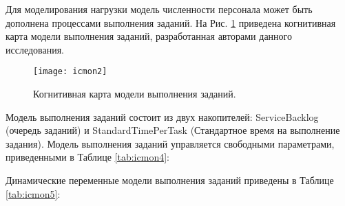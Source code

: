 Для моделирования нагрузки модель численности персонала может быть дополнена процессами выполнения заданий. 
На Рис. \ref{fig:icmon2}  приведена когнитивная карта модели выполнения заданий, разработанная авторами данного исследования.

\begin{figure}[H]
  \caption{Когнитивная карта модели выполнения заданий.}
  \centering
    \texttt{[image: icmon2]}
  \label{fig:icmon2}
\end{figure}  

Модель выполнения заданий состоит из двух накопителей: ServiceBacklog (очередь заданий) и StandardTimePerTask (Стандартное время на выполнение задания). 
Модель выполнения заданий управляется свободными параметрами, приведенными в Таблице \ref{tab:icmon4}:

\begin{table}[H]
\centering
\caption{Свободные параметры модели выполнения заданий.}
\label{tab:icmon4}
\end{table}

Динамические переменные модели выполнения заданий приведены в Таблице \ref{tab:icmon5}:

